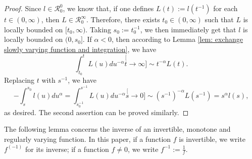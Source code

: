 \documentclass[12pt, a4paper]{amsart}
\theoremstyle{definition}
\numberwithin{equation}{section}
\begin{document}
\begin{proof}
	Since $l \in \mathcal R^0_0$, we know that, if one defines $L(t):=l(t^{-1})$ for each $t\in (0,\infty)$, then $ L \in \mathcal R^\infty_0$.
	Therefore, there exists $t_0\in (0,\infty)$ such that $L$ is locally bounded on $[t_0,\infty)$.
	Taking $s_0:= t_0^{-1}$, we then immediately get that $l$ is locally bounded on $(0,s_0]$.
	If $\alpha<0 $, then according to Lemma \ref{lem: exchange slowly varying function and integration}, we have
\[
	\int_{t_0}^t L(u)du^{-\alpha}
	\stackrel[t\to \infty]{}{\sim} t^{-\alpha}  L(t).
\]
	Replacing $t$ with $s^{-1}$, we have
\[
	-\int_{s}^{s_0} l(u)du^{\alpha}
	=\int_{s_0^{-1}}^{s^{-1}} L(u)du^{-\alpha}
	\stackrel[s\to 0]{}{\sim}  (s^{-1})^{-\alpha}L(s^{-1})
	=s^\alpha l(s),
\]
	as desired.
	The second assertion can be proved similarly.
\end{proof}

	The following lemma concerns the inverse of
   an invertible, monotone and regularly varying function.
	In this paper, if a function $f$ is 	invertible,
	we write $f^{(-1)}$ for its inverse;
	if a function $f\neq 0$, we write $f^{-1} := \frac{1}{f} $.
\end{document}
